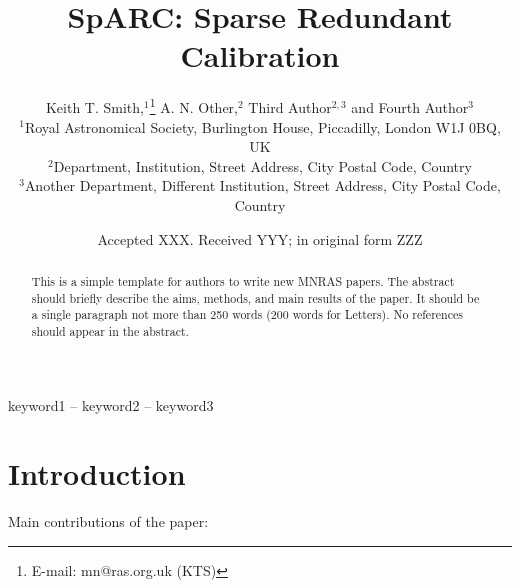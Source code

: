 \documentclass[a4paper,fleqn,usenatbib]{mnras}
\title[Sparse Redundant Calibration]{SpARC: Sparse Redundant Calibration}
\author[K. T. Smith et al.]{
Keith T. Smith,$^{1}$\thanks{E-mail: mn@ras.org.uk (KTS)}
A. N. Other,$^{2}$
Third Author$^{2,3}$
and Fourth Author$^{3}$
\\
$^{1}$Royal Astronomical Society, Burlington House, Piccadilly, London W1J 0BQ, UK\\
$^{2}$Department, Institution, Street Address, City Postal Code, Country\\
$^{3}$Another Department, Different Institution, Street Address, City Postal Code, Country
}
\date{Accepted XXX. Received YYY; in original form ZZZ}
\begin{document}
\label{firstpage}
\pagerange{\pageref{firstpage}--\pageref{lastpage}}
\maketitle

\begin{abstract}
This is a simple template for authors to write new MNRAS papers.
The abstract should briefly describe the aims, methods, and main results of the paper.
It should be a single paragraph not more than 250 words (200 words for Letters).
No references should appear in the abstract.
\end{abstract}

\begin{keywords}
keyword1 -- keyword2 -- keyword3
\end{keywords}



\section{Introduction}

Main contributions of the paper:
\end{document}
